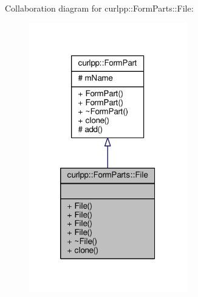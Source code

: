 Collaboration diagram for curlpp\-:\-:Form\-Parts\-:\-:File\-:\nopagebreak
\begin{figure}[H]
\begin{center}
\leavevmode
\includegraphics[width=194pt]{classcurlpp_1_1FormParts_1_1File__coll__graph}
\end{center}
\end{figure}
